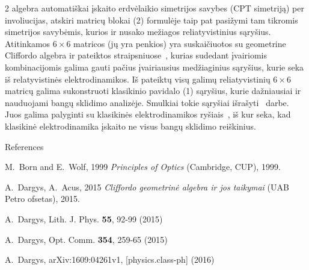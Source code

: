 \documentclass[a4paper,10pt,lithuanian]{article}
\begin{document}
\begin{multicols*}{2}
algebra automatiškai įskaito erdvėlaikio simetrijos savybes (CPT
simetriją) per involiucijas, atskiri matricų blokai (2) formulėje
taip pat pasižymi tam tikromis simetrijos  savybėmis, kurios ir
nusako mežiagos reliatyvistinius sąryšius. Atitinkamos $6\times 6$
matricos (jų yra penkios) yra suskaičiuotos su geometrine Cliffordo algebra  ir   pateiktos straipsniuose~\cite{key-4,key-5},
kurias sudedant įvairiomis kombinacijomis galima gauti pačius
įvairiausius medžiaginius sąryšius, kurie seka iš relatyvistinės
elektrodinamikos. Iš pateiktų visų galimų reliatyvistinių $6\times
6$ matricų galima sukonstruoti  klasikinio pavidalo  (1) sąryšius, kurie
dažniausiai ir nauduojami bangų sklidimo analizėje. Smulkiai tokie
sąryšiai išrašyti~\cite{key-5} darbe. Juos galima palyginti su klasikinės elektrodinamikos ryšiais~\cite{key-3},
iš kur seka,  kad klasikinė elektrodinamika įskaito ne visus bangų sklidimo reiškinius.

  
  
  

\begin{thebibliography}{References}

M.~Born and E.~Wolf, 1999 \textit{Principles of Optics}
   (Cambridge, CUP), 1999.

A.~Dargys, A.~Acus, 2015 \textit{Cliffordo
  geometrinė algebra  ir jos taikymai} (UAB Petro ofsetas), 2015.

A.~Dargys,   Lith. J. Phys. {\bf 55}, 92-99 (2015)

A.~Dargys, Opt. Comm. {\bf 354}, 259-65 (2015)

A.~Dargys,  arXiv:1609:04261v1, [physics.class-ph] (2016)

\end{thebibliography}





\end{multicols*}
\end{document}
